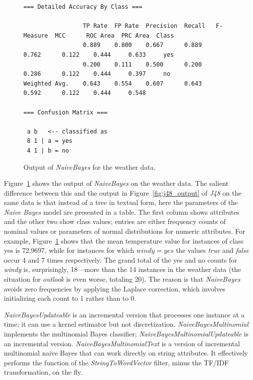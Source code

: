 \begin{figure}[!p]
\begin{mdframed}[innermargin=-1.5cm]
\begin{Verbatim}[fontsize=\scriptsize]
=== Detailed Accuracy By Class ===

                 TP Rate  FP Rate  Precision  Recall   F-Measure  MCC      ROC Area  PRC Area  Class
                 0.889    0.800    0.667      0.889    0.762      0.122    0.444     0.633     yes
                 0.200    0.111    0.500      0.200    0.286      0.122    0.444     0.397     no
Weighted Avg.    0.643    0.554    0.607      0.643    0.592      0.122    0.444     0.548     

=== Confusion Matrix ===

 a b   <-- classified as
 8 1 | a = yes
 4 1 | b = no
\end{Verbatim}
\end{mdframed}
\caption{\label{fig:naive_bayes_output}Output of \textit{NaiveBayes} for the weather data.}
\end{figure}

Figure~\ref{fig:naive_bayes_output} shows the output of
\textit{NaiveBayes} on the weather data. The salient difference
between this and the output in Figure~\ref{fig:j48_output} of
\textit{J48} on the same data is that instead of a tree in textual
form, here the parameters of the \textit{Naive Bayes} model are
presented in a table. The first column shows attributes and the other
two show class values; entries are either frequency counts of nominal
values or parameters of normal distributions for numeric
attributes. For example, Figure~\ref{fig:naive_bayes_output} shows
that the mean temperature value for instances of class yes is 72.9697,
while for instances for which $windy = yes$ the values \textit{true}
and \textit{false} occur 4 and 7 times respectively. The grand total
of the yes and no counts for \textit{windy} is, surprisingly,
18---more than the 14 instances in the weather data (the situation for
\textit{outlook} is even worse, totaling 20). The reason is that
\textit{NaiveBayes} avoids zero frequencies by applying the Laplace
correction, which involves initializing each count to 1 rather than to
0.

\textit{NaiveBayesUpdateable} is an incremental version that processes
one instance at a time; it can use a kernel estimator but not
discretization. \textit{NaiveBayesMultinomial} implements the
multinomial Bayes classifier; \textit{NaiveBayesMultinomialUpdateable}
is an incremental version. \textit{NaiveBayesMultinomialText} is a
version of incremental multinomial naive Bayes that can work directly
on string attributes. It effectively performs the function of the
\textit{StringToWordVector} filter, minus the TF/IDF transformation,
on the fly.

